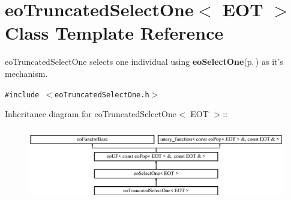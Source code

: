 \section{eo\-Truncated\-Select\-One$<$ EOT $>$ Class Template Reference}
\label{classeo_truncated_select_one}
eo\-Truncated\-Select\-One selects one individual using {\bf eo\-Select\-One}{\rm (p.\,\pageref{classeo_select_one})} as it's mechanism.  


{\tt \#include $<$eo\-Truncated\-Select\-One.h$>$}

Inheritance diagram for eo\-Truncated\-Select\-One$<$ EOT $>$::\begin{figure}[H]
\begin{center}
\leavevmode
\includegraphics[height=3.23699cm]{classeo_truncated_select_one}
\end{center}
\end{figure}
